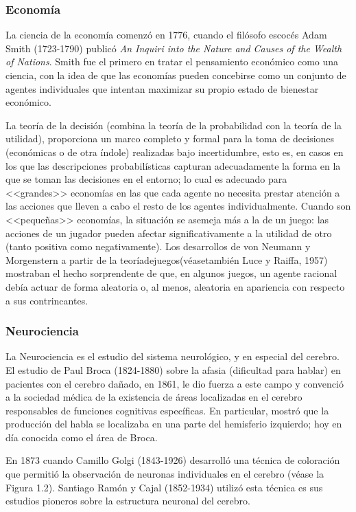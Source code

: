\documentclass{article}
\begin{document}
 \subsubsection{Economía}
 
 La ciencia de la economía comenzó en 1776, cuando el filósofo escocés Adam Smith (1723-1790) publicó \textit{An Inquiri into the Nature and Causes of the Wealth of Nations}. Smith fue el primero en tratar el pensamiento económico como una ciencia, con la idea de que las economías pueden concebirse como un conjunto de agentes individuales que intentan maximizar su propio estado de bienestar económico. 
 
La teoría de la decisión (combina la teoría de la probabilidad con la teoría de la utilidad), proporciona un marco completo y formal para la toma de decisiones (económicas o de otra índole) realizadas bajo incertidumbre, esto es, en casos en los que las descripciones probabilísticas capturan adecuadamente la forma en la que se toman las decisiones en el entorno; lo cual es adecuado para <<grandes>> economías  en las que cada agente no necesita prestar atención a las acciones que lleven a cabo el resto de los agentes individualmente. Cuando son <<pequeñas>> economías, la situación se asemeja más a la de un juego: las acciones de un jugador pueden afectar significativamente a la utilidad de otro (tanto positiva como negativamente). Los desarrollos de von Neumann y Morgenstern a partir de la teoríadejuegos(véasetambién Luce y Raiffa, 1957) mostraban el hecho sorprendente de que, en algunos juegos, un agente racional debía actuar de forma aleatoria o, al menos, aleatoria en apariencia con respecto a sus contrincantes.


\subsubsection{Neurociencia}

La Neurociencia es el estudio del sistema neurológico, y en especial del cerebro. El estudio de Paul Broca (1824-1880) sobre la afasia (dificultad para hablar) en pacientes con el cerebro dañado, en 1861, le dio fuerza a este campo y convenció a la sociedad médica de la existencia de áreas localizadas en el cerebro responsables de funciones cognitivas específicas. En particular, mostró que la producción del habla se localizaba en una parte del hemisferio izquierdo; hoy en día conocida como el área de Broca.

En  1873 cuando Camillo Golgi (1843-1926) desarrolló una técnica de coloración que permitió la observación de neuronas individuales en el cerebro (véase la Figura 1.2). Santiago Ramón y Cajal (1852-1934) utilizó esta técnica es sus estudios pioneros sobre la estructura neuronal del cerebro.
\end{document}
